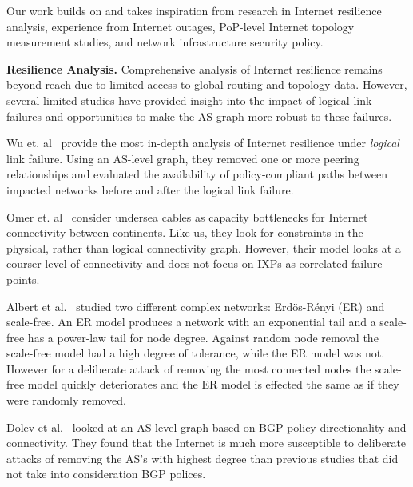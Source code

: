Our work builds on and takes inspiration from research in Internet resilience analysis, experience from Internet outages, PoP-level Internet topology measurement studies, and network infrastructure security policy.

{\bf Resilience Analysis.}
    Comprehensive analysis of Internet resilience remains beyond reach due to limited access to global routing and topology data. 
    However, several limited studies have provided insight into the impact of logical link failures and opportunities to make the AS graph more robust to these failures.
    
    Wu et. al~\cite{michigan} provide the most in-depth analysis of Internet resilience under {\it logical} link failure.
    Using an AS-level graph, they removed one or more peering relationships and evaluated the availability of policy-compliant paths between impacted networks before and after the logical link failure.

    Omer et. al~\cite{measuringresilience} consider undersea cables as capacity bottlenecks for Internet connectivity between continents. 
    Like us, they look for constraints in the physical, rather than logical connectivity graph. 
    However, their model looks at a courser level of connectivity and does not focus on IXPs as correlated failure points. 

    Albert et al.~\cite{resilience-complex-networks} studied two different
    complex networks: Erd\"{o}s-R\'{e}nyi (ER) and scale-free. An ER model
    produces a network with an exponential tail and a scale-free has a power-law
    tail for node degree. Against random node removal the scale-free model had a
    high degree of tolerance, while the ER model was not. However for a
    deliberate attack of removing the most connected nodes the scale-free model
    quickly deteriorates and the ER model is effected the same as if they were
    randomly removed.

    Dolev et al.~\cite{resilience-under-BGP} looked at an AS-level graph based
    on BGP policy directionality and connectivity. They found that the Internet
    is much more susceptible to deliberate attacks of removing the AS's with
    highest degree than previous studies that did not take into consideration
    BGP polices.
    
